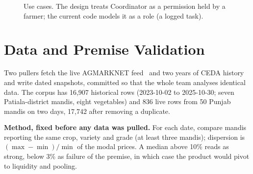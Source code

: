 \documentclass[conference]{IEEEtran}
\begin{document}
\begin{figure}[!t]
\centering
{}
\caption{Use cases. The design treats Coordinator as a permission held by
a farmer; the current code models it as a role (a logged task).}
\label{fig:usecase}
\end{figure}

\section{Data and Premise Validation}
\label{sec:data}
Two pullers fetch the live AGMARKNET feed~\cite{datagov} and two years of
CEDA history~\cite{ceda} and write dated snapshots, committed so that the
whole team analyses identical data. The corpus has 16,907 historical rows
(2023-10-02 to 2025-10-30; seven Patiala-district mandis, eight vegetables)
and 836 live rows from 50 Punjab mandis on two days, 17,742 after removing
a duplicate.

\textbf{Method, fixed before any data was pulled.} For each date, compare
mandis reporting the same crop, variety and grade (at least three
mandis); dispersion is $(\max - \min)/\min$ of the modal prices. A median
above 10\% reads as strong, below 3\% as failure of the premise, in which
case the product would pivot to liquidity and pooling.
\end{document}
